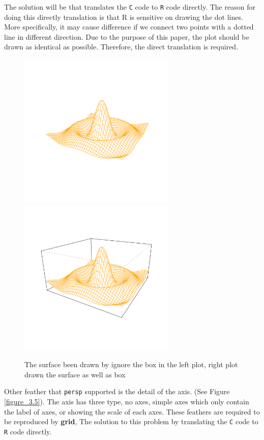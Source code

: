 \documentclass{report}
\begin{document}
The solution will be that translates the \texttt{C} code to \texttt{R} code directly. The reason for doing this directly translation is that R is sensitive on drawing the dot lines. More specifically, it may cause difference if we connect two points with a dotted line in different direction. Due to the purpose of this paper, the plot should be drawn as identical as possible. Therefore, the direct translation is required.\\


\begin{figure}[h]
	\begin{center}
		\includegraphics[height = 7.5cm, width = 7.5cm]{figure/box_example_1.pdf}
		\includegraphics[height = 7.5cm, width = 7.5cm]{figure/box_example_2.pdf}
		\caption{The surface been drawn by ignore the box in the left plot, right plot drawn the surface as well as box}
		\label{figure_3.4}
	\end{center}
\end{figure}

\newpage
Other feather that \texttt{persp} supported is the detail of the axis. (See Figure \ref{figure_3.5}). The axis has three type, no axes, simple axes which only contain the label of axes, or showing the scale of each axes. These feathers are required to be reproduced by \textbf{grid}, The solution to this problem by translating the \texttt{C} code to \texttt{R} code directly.
\end{document}
